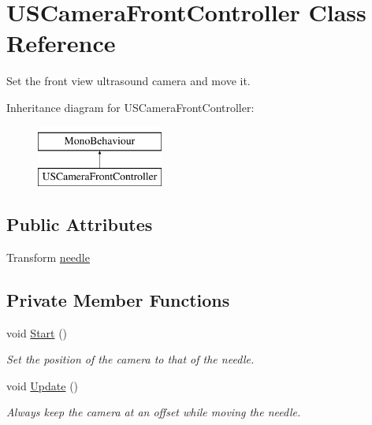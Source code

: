 \hypertarget{class_u_s_camera_front_controller}{}\section{U\+S\+Camera\+Front\+Controller Class Reference}
\label{class_u_s_camera_front_controller}


Set the front view ultrasound camera and move it.  


Inheritance diagram for U\+S\+Camera\+Front\+Controller\+:\begin{figure}[H]
\begin{center}
\leavevmode
\includegraphics[height=2.000000cm]{class_u_s_camera_front_controller}
\end{center}
\end{figure}
\subsection*{Public Attributes}
\begin{DoxyCompactItemize}
\item 
Transform \mbox{\hyperlink{class_u_s_camera_front_controller_a699d102b264fb7b8e576c5f4b19a036f}{needle}}
\end{DoxyCompactItemize}
\subsection*{Private Member Functions}
\begin{DoxyCompactItemize}
\item 
\mbox{\label{class_u_s_camera_front_controller_a213f2151444f3da1bc4ff2f0341f92b8}} 
void \mbox{\hyperlink{class_u_s_camera_front_controller_a213f2151444f3da1bc4ff2f0341f92b8}{Start}} ()
\begin{DoxyCompactList}\small\item\em Set the position of the camera to that of the needle. \end{DoxyCompactList}\item 
\mbox{\label{class_u_s_camera_front_controller_a98d7f71687398cad52af849f46828c85}} 
void \mbox{\hyperlink{class_u_s_camera_front_controller_a98d7f71687398cad52af849f46828c85}{Update}} ()
\begin{DoxyCompactList}\small\item\em Always keep the camera at an offset while moving the needle. \end{DoxyCompactList}\end{DoxyCompactItemize}


